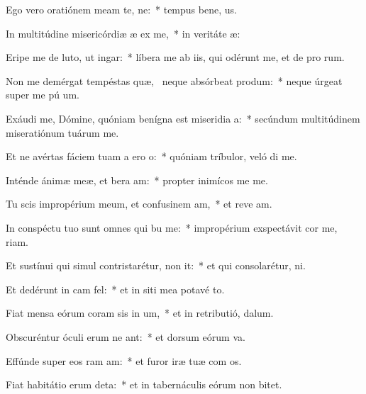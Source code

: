 \item Ego vero oratiónem meam  te, ne:~* tempus bene, us.
\item In multitúdine misericórdiæ æ ex me,~* in veritáte  æ:
\item Eripe me de luto, ut  ingar:~* líbera me ab iis, qui odérunt me, et de pro rum.
\item Non me demérgat tempéstas quæ,~\pscross{} neque absórbeat  produm:~* neque úrgeat super me pú  um.
\item Exáudi me, Dómine, quóniam benígna est miseridia a:~* secúndum multitúdinem miseratiónum tuárum   me.
\item Et ne avértas fáciem tuam a ero o:~* quóniam tríbulor, veló di me.
\item Inténde ánimæ meæ, et bera am:~* propter inimícos me  me.
\item Tu scis impropérium meum, et confusinem am,~* et reve am.
\item In conspéctu tuo sunt omnes qui bu me:~* impropérium exspectávit cor me,  riam.
\item Et sustínui qui simul contristarétur,  non it:~* et qui consolarétur,   ni.
\item Et dedérunt in cam  fel:~* et in siti mea potavé  to.
\item Fiat mensa eórum coram sis in um,~* et in retributió,   dalum.
\item Obscuréntur óculi erum ne ant:~* et dorsum eórum  va.
\item Effúnde super eos ram am:~* et furor iræ tuæ com os.
\item Fiat habitátio erum deta:~* et in tabernáculis eórum non   bitet.
